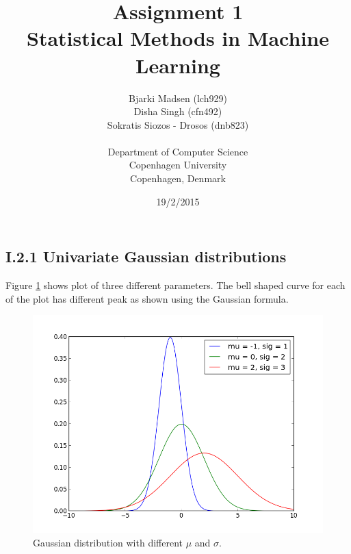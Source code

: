 \documentclass[12pt]{article}
\newcommand{\assignmentname}{Assignment 1}
\newcommand{\coursename}{Statistical Methods in Machine Learning}
\newcommand{\studentnameOne}{Bjarki Madsen (lch929)}
\newcommand{\studentnameTwo}{Disha Singh (cfn492)}
\newcommand{\studentnameThree}{Sokratis Siozos - Drosos (dnb823)}
\newcommand{\department}{Department of Computer Science}
\newcommand{\institution}{Copenhagen University}
\newcommand{\location}{Copenhagen, Denmark}
\begin{document}
\renewcommand\refname{References}

\title{\assignmentname \\ {\Large {\textsc \coursename}}}
\author{
        \studentnameOne \\
        \studentnameTwo \\
        \studentnameThree \\ \\
                \department \\
        \institution \\
        \location
}
\date{19/2/2015}

\maketitle
\thispagestyle{empty}

\pagebreak

\subsection*{I.2.1 Univariate Gaussian distributions}

  Figure \ref{fig:gaussian_distribution} shows plot of three different parameters. The bell shaped curve for  each of the plot has different peak as shown using the Gaussian formula. 

  \begin{figure}[h]
    \centering
        \includegraphics[width=1.0\textwidth]{figures/figure_I_2_1}
    \caption{Gaussian distribution with different $\mu$ and $\sigma$.}
    \label{fig:gaussian_distribution}
  \end{figure}
\end{document}
